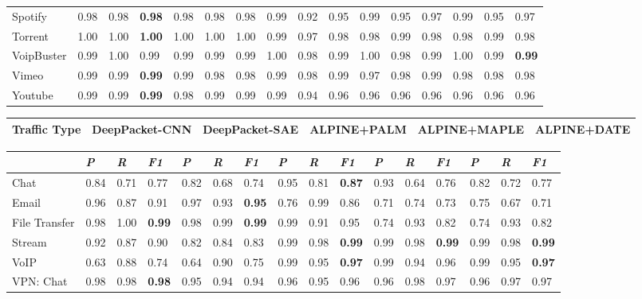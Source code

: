 \begin{table} [ht!]
\begin{tabular} {|p{2cm}|p{0.5cm}p{0.5cm}p{0.5cm}|p{0.5cm}p{0.5cm}p{0.5cm}|p{0.5cm}p{0.5cm}p{0.5cm}|p{0.5cm}p{0.5cm}p{0.5cm}|p{0.5cm}p{0.5cm}p{0.5cm}|}
Spotify & 0.98 & 0.98 & \textbf{0.98} & 0.98 & 0.98 & 0.98 & 0.99 & 0.92 & 0.95 & 0.99 & 0.95 & 0.97 & 0.99 & 0.95 & 0.97 \\
Torrent & 1.00 & 1.00 & \textbf{1.00} & 1.00 & 1.00 & 1.00 & 0.99 & 0.97 & 0.98 & 0.98 & 0.99 & 0.98 & 0.98 & 0.99 & 0.98 \\
VoipBuster & 0.99 & 1.00 & 0.99 & 0.99 & 0.99 & 0.99 & 1.00 & 0.98 & 0.99 & 1.00 & 0.98 & 0.99 & 1.00 & 0.99 & \textbf{0.99} \\
Vimeo & 0.99 & 0.99 & \textbf{0.99} & 0.99 & 0.98 & 0.98 & 0.99 & 0.98 & 0.99 & 0.97 & 0.98 & 0.99 & 0.98 & 0.98 & 0.98 \\
Youtube & 0.99 & 0.99 & \textbf{0.99} & 0.98 & 0.99 & 0.99 & 0.99 & 0.94 & 0.96 & 0.96 & 0.96 & 0.96 & 0.96 & 0.96 & 0.96 \\
\hline
\end{tabular}
\begin{tabular} {|p{2cm}|p{2.3cm}|p{2.4cm}|p{2.3cm}|p{2.4cm}|p{2.3cm}|}
\hline
\textbf{Traffic Type} & DeepPacket-CNN & DeepPacket-SAE & ALPINE+PALM & ALPINE+MAPLE & ALPINE+DATE \\
\hline
\end{tabular}
\begin{tabular} {|p{2cm}|p{0.5cm}p{0.5cm}p{0.5cm}|p{0.5cm}p{0.5cm}p{0.5cm}|p{0.5cm}p{0.5cm}p{0.5cm}|p{0.5cm}p{0.5cm}p{0.5cm}|p{0.5cm}p{0.5cm}p{0.5cm}|}
\hline
& \textit{P} & \textit{R} & \textit{F1} & \textit{P} & \textit{R} & \textit{F1} & \textit{P} & \textit{R} & %
\textit{F1} & \textit{P} & \textit{R} & \textit{F1} & \textit{P} & \textit{R} & \textit{F1} \\
\hline
Chat & 0.84 & 0.71 & 0.77 & 0.82 & 0.68 & 0.74 & 0.95 & 0.81 & \textbf{0.87} & 0.93 & 0.64 & 0.76 & 0.82 & 0.72 & 0.77 \\
Email & 0.96 & 0.87 & 0.91 & 0.97 & 0.93 & \textbf{0.95} & 0.76 & 0.99 & 0.86 & 0.71 & 0.74 & 0.73 & 0.75 & 0.67 & 0.71\\
File Transfer & 0.98 & 1.00 & \textbf{0.99} & 0.98 & 0.99 & \textbf{0.99} & 0.99 & 0.91 & 0.95 & 0.74 & 0.93 & 0.82 & 0.74 & 0.93 & 0.82 \\
Stream & 0.92 & 0.87 & 0.90 & 0.82 & 0.84 & 0.83 & 0.99 & 0.98 & \textbf{0.99} & 0.99 & 0.98 & \textbf{0.99} & 0.99 & 0.98 & \textbf{0.99} \\
VoIP & 0.63 & 0.88 & 0.74 & 0.64 & 0.90 & 0.75 & 0.99 & 0.95 & \textbf{0.97} & 0.99 & 0.94 & 0.96 & 0.99 & 0.95 & \textbf{0.97} \\
VPN: Chat & 0.98 & 0.98 & \textbf{0.98} & 0.95 & 0.94 & 0.94 & 0.96 & 0.95 & 0.96 & 0.96 & 0.98 & 0.97 & 0.96 & 0.97 & 0.97 \\

\end{tabular}
\end{table}
